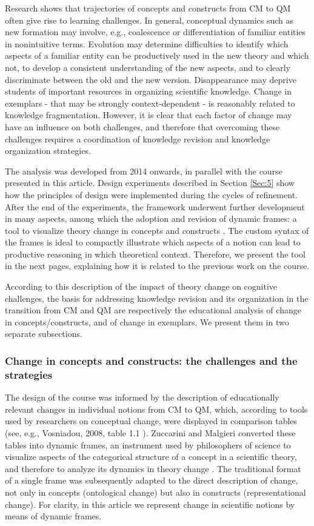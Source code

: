 \documentclass[twocolumn,secnumarabic,amssymb, nobibnotes, aps, prd, nofootinbib]{revtex4-2}
\begin{document}
Research shows that trajectories of concepts and constructs from CM to QM often give rise to learning challenges. In general, conceptual dynamics such as new formation may involve, e.g., coalescence or differentiation of familiar entities in nonintuitive terms. Evolution may determine difficulties to identify which aspects of a familiar entity can be productively used in the new theory and which not, to develop a consistent understanding of the new aspects, and to clearly discriminate between the old and the new version. Disappearance may deprive students of important resources in organizing scientific knowledge. Change in exemplars - that may be strongly context-dependent - is reasonably related to knowledge fragmentation. However, it is clear that each factor of change may have an influence on both challenges, and therefore that overcoming these challenges requires a coordination of knowledge revision and knowledge organization strategies.

The analysis was developed from 2014 onwards, in parallel with the course presented in this article. Design experiments described in Section \ref{Sec:5} show how the principles of design were implemented during the cycles of refinement. After the end of the experiments, the framework underwent further development in many aspects, among which
the adoption and revision of dynamic frames: a tool to visualize theory change in concepts and constructs \cite{Andersen2006}. The custom syntax of the frames is ideal to compactly illustrate which aspects of a notion can lead to productive reasoning in which theoretical context. Therefore, we present the tool in the next pages, explaining how it is related to the previous work on the course.

According to this description of the impact of theory change on cognitive challenges, the basis for addressing knowledge revision and its organization in the transition from CM and QM are respectively the educational analysis of change in concepts/constructs, and of change in exemplars.
We present them in two separate subsections.

\subsubsection{Change in concepts and constructs: the challenges and the strategies} \label{Sec:2.1.1}
The design of the course was informed by the description of educationally relevant changes in individual notions from CM to QM, which, according to tools used by researchers on conceptual change, were displayed in comparison tables (see, e.g., Vosniadou, 2008, table 1.1 \cite{Vosniadou2008}). Zuccarini and Malgieri \cite{Zuccarini2022} converted these tables into dynamic frames, an instrument used by philosophers of science to visualize aspects of the categorical structure of a concept in a scientific theory, and therefore to analyze its dynamics in theory change \cite{Andersen2006}. The traditional format of a single frame was subsequently adapted to the direct description of change, not only in concepts (ontological change) but also in constructs (representational change). For clarity, in this article we represent change in scientific notions by means of dynamic frames.
\end{document}
